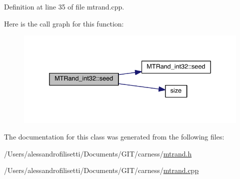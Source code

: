 Definition at line 35 of file mtrand.\-cpp.



Here is the call graph for this function\-:\nopagebreak
\begin{figure}[H]
\begin{center}
\leavevmode
\includegraphics[width=336pt]{a00019_a3cabc1e3445716236a570ffd2f69686d_cgraph}
\end{center}
\end{figure}




The documentation for this class was generated from the following files\-:\begin{DoxyCompactItemize}
\item 
/\-Users/alessandrofilisetti/\-Documents/\-G\-I\-T/carness/\hyperlink{a00091}{mtrand.\-h}\item 
/\-Users/alessandrofilisetti/\-Documents/\-G\-I\-T/carness/\hyperlink{a00090}{mtrand.\-cpp}\end{DoxyCompactItemize}
